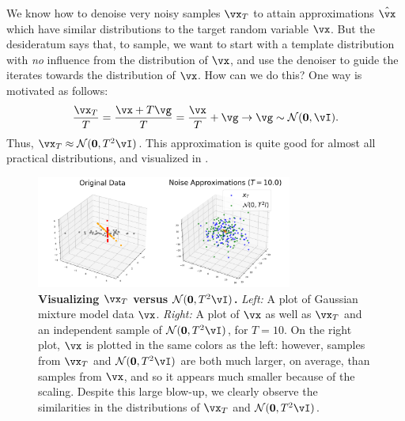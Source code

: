 \documentclass[../../book-main.tex]{subfiles}
\begin{document}
We know how to denoise very noisy samples \(\vx_{T}\) to attain approximations \(\hat{\vx}\) which have similar distributions to the target random variable \(\vx\). But the desideratum says that, to sample, we want to start with a template distribution with \textit{no} influence from the distribution of \(\vx\), and use the denoiser to guide the iterates towards the distribution of \(\vx\). How can we do this? One way is motivated as follows:
\begin{equation}\label{eq:ve_converge_to_large_gaussian}
	\frac{\vx_{T}}{T} = \frac{\vx + T\vg}{T} = \frac{\vx}{T} + \vg \to \vg \sim \dNorm(\vzero, \vI).
\end{equation}
Thus, \(\vx_{T} \approx \dNorm(\vzero, T^{2}\vI)\). This approximation is quite good for almost all practical distributions, and visualized in .
\begin{figure}
	\centering 
	\includegraphics[width=0.75\textwidth]{chapters/chapter3/figs/xT_vs_noise.png}
	\caption{\small\textbf{Visualizing \(\vx_{T}\) versus \(\dNorm(\vzero, T^{2}\vI)\).} \textit{Left:} A plot of Gaussian mixture model data \(\vx\). \textit{Right:} A plot of \(\vx\) as well as \(\vx_{T}\) and an independent sample of \(\dNorm(\vzero, T^{2}\vI)\), for \(T = 10\). On the right plot, \(\vx\) is plotted in the same colors as the left: however, samples from \(\vx_{T}\) and \(\dNorm(\vzero, T^{2}\vI)\) are both much larger, on average, than samples from \(\vx\), and so it appears much smaller because of the scaling. Despite this large blow-up, we clearly observe the similarities in the distributions of \(\vx_{T}\) and \(\dNorm(\vzero, T^{2}\vI)\).}
	\label{fig:xT_vs_noise}
\end{figure}
\end{document}
